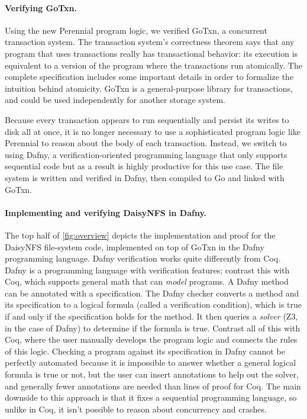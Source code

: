 \paragraph{Verifying GoTxn.}
Using the new Perennial program logic, we verified GoTxn, a concurrent
transaction system.
The transaction system's correctness theorem says that any program that uses
transactions really has transactional behavior: its execution is equivalent to a
version of the program where the transactions run atomically. The complete
specification includes some important details in order to formalize the
intuition behind atomicity. GoTxn is a general-purpose library for transactions,
and could be used independently for another storage system.

Because every transaction appears to run sequentially and persist its writes to
disk all at once, it is no longer necessary to use a sophisticated program logic
like Perennial to reason about the body of each transaction. Instead, we switch
to using Dafny, a verification-oriented programming language that only supports
sequential code but as a result is highly productive for this use case. The file
system is written and verified in Dafny, then compiled to Go and linked with
GoTxn.

\paragraph{Implementing and verifying DaisyNFS in Dafny.}
The top half of \cref{fig:overview} depicts the implementation and proof for the
DaisyNFS file-system code, implemented on top of GoTxn in the Dafny programming language.
Dafny verification works quite differently from Coq. Dafny is a programming
language with verification features; contrast this with Coq, which supports
general math that can \emph{model} programs. A Dafny method can be annotated
with a specification. The Dafny checker converts a method and its specification
to a logical formula (called a verification condition), which is true if and only if the specification holds for
the method. It then queries a \emph{solver} (Z3, in the case of Dafny) to determine if the formula is true.
Contrast all of this with Coq, where the user manually develops the program
logic and connects the rules of this logic. Checking a program against its specification in Dafny cannot be perfectly
automated because it is impossible to answer whether a general logical formula
is true or not, but the user can insert annotations to help out the solver, and
generally fewer annotations are needed than lines of proof for Coq. The main
downside to this approach is that it fixes a sequential programming language, so
unlike in Coq, it isn't possible to reason about concurrency and crashes.

